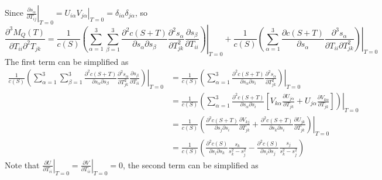 \documentclass[10pt]{article}
\begin{document}
Since $\left.\frac{\partial s_\alpha}{\partial T_{ij}}\right|_{T=0} = \left.U_{i\alpha}V_{j\alpha}\right|_{T=0} = \delta_{i\alpha}\delta_{j\alpha}$, so
\begin{equation}
	\frac{\partial^3 M_Q(T)}{\partial T_{ii} \partial^2 T_{jk}} = \frac{1}{c(S)}\left.\left( \sum_{\alpha=1}^3\sum_{\beta=1}^3 \frac{\partial^2 c(S+T)}{\partial s_\alpha \partial s_\beta} \frac{\partial^2 s_\alpha}{\partial T_{jk}^2} \frac{\partial s_\beta}{\partial T_{ii}} \right)\right|_{T=0} + \frac{1}{c(S)}\left.\left( \sum_{\alpha=1}^3 \frac{\partial c(S+T)}{\partial s_\alpha} \frac{\partial^3 s_\alpha}{\partial T_{ii}\partial T^2_{jk}} \right)\right|_{T=0}
\end{equation}
The first term can be simplified as
\begin{align}
	\frac{1}{c(S)}\left.\left( \sum_{\alpha=1}^3\sum_{\beta=1}^3 \frac{\partial^2 c(S+T)}{\partial s_\alpha \partial s_\beta} \frac{\partial^2 s_\alpha}{\partial T_{jk}^2} \frac{\partial s_\beta}{\partial T_{ii}} \right)\right|_{T=0} &= \frac{1}{c(S)}\left.\left( \sum_{\alpha=1}^3 \frac{\partial^2 c(S+T)}{\partial s_\alpha \partial s_i} \frac{\partial^2 s_\alpha}{\partial T_{jk}^2} \right)\right|_{T=0} \nonumber \\
	&= \frac{1}{c(S)}\left.\left( \sum_{\alpha=1}^3 \frac{\partial^2 c(S+T)}{\partial s_\alpha \partial s_i} \left[ V_{k\alpha}\frac{\partial U_{j\alpha}}{\partial T_{jk}} + U_{j\alpha}\frac{\partial V_{k\alpha}}{\partial T_{jk}} \right] \right)\right|_{T=0} \nonumber \\
	&= \frac{1}{c(S)} \left.\left( \frac{\partial^2 c(S+T)}{\partial s_j \partial s_i} \frac{\partial V_{kj}}{\partial T_{jk}} + \frac{\partial^2 c(S+T)}{\partial s_k \partial s_i} \frac{\partial U_{jk}}{\partial T_{jk}} \right)\right|_{T=0} \nonumber \\
	&= \frac{1}{c(S)} \left( \frac{\partial^2 c(S)}{\partial s_i \partial s_k} \frac{s_k}{s_k^2-s_j^2} - \frac{\partial^2 c(S)}{\partial s_i \partial s_j} \frac{s_j}{s_k^2-s_j^2} \right)
\end{align}
Note that $\left.\frac{\partial U}{\partial T_{ii}}\right|_{T=0} = \left.\frac{\partial V}{\partial T_{ii}}\right|_{T=0} = 0$, the second term can be simplified as 
\end{document}
